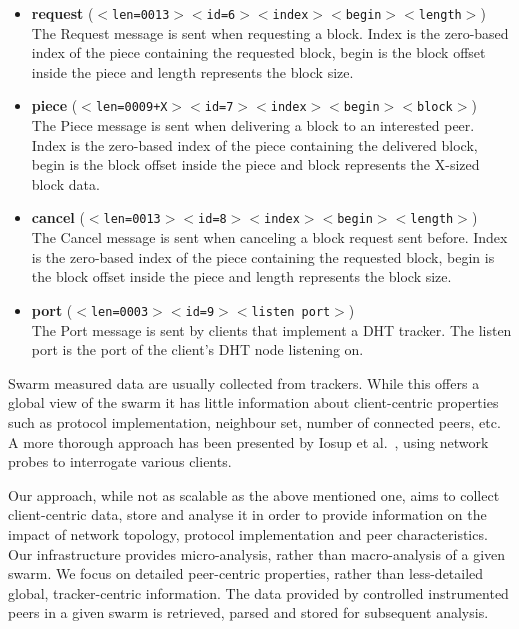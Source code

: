 \begin{itemize}
  \item \textbf{request}
  (\texttt{$<$len=0013$>$$<$id=6$>$$<$index$>$$<$begin$>$$<$length$>$}) \\
    The Request message is sent when requesting a block. Index is the
    zero-based index of the piece containing the requested block, begin is the
    block offset inside the piece and length represents the block size.

  \item \textbf{piece}
  (\texttt{$<$len=0009+X$>$$<$id=7$>$$<$index$>$$<$begin$>$$<$block$>$}) \\
    The Piece message is sent when delivering a block to an interested peer.
    Index is the zero-based index of the piece containing the delivered block,
    begin is the block offset inside the piece and block represents the
    X-sized block data.

  \item \textbf{cancel}
  (\texttt{$<$len=0013$>$$<$id=8$>$$<$index$>$$<$begin$>$$<$length$>$}) \\
    The Cancel message is sent when canceling a block request sent before.
    Index is the zero-based index of the piece containing the requested block,
    begin is the block offset inside the piece and length represents the block
    size.

  \item \textbf{port} (\texttt{$<$len=0003$>$$<$id=9$>$$<$listen port$>$}) \\
The Port message is sent by clients that implement a DHT tracker. The listen port is the port of the client's DHT node listening on.

\end{itemize}

Swarm measured data are usually collected from trackers. While this offers a
global view of the swarm it has little information about client-centric
properties such as protocol implementation, neighbour set, number of connected
peers, etc. A more thorough approach has been presented by Iosup et
al.~\cite{corr-overlay}, using network probes to interrogate various clients.

Our approach, while not as scalable as the above mentioned one, aims to collect
client-centric data, store and analyse it in order to provide information on
the impact of network topology, protocol implementation and peer
characteristics. Our infrastructure provides micro-analysis, rather than
macro-analysis of a given swarm. We focus on detailed peer-centric properties,
rather than less-detailed global, tracker-centric information. The data
provided by controlled instrumented peers in a given swarm is retrieved,
parsed and stored for subsequent analysis.

